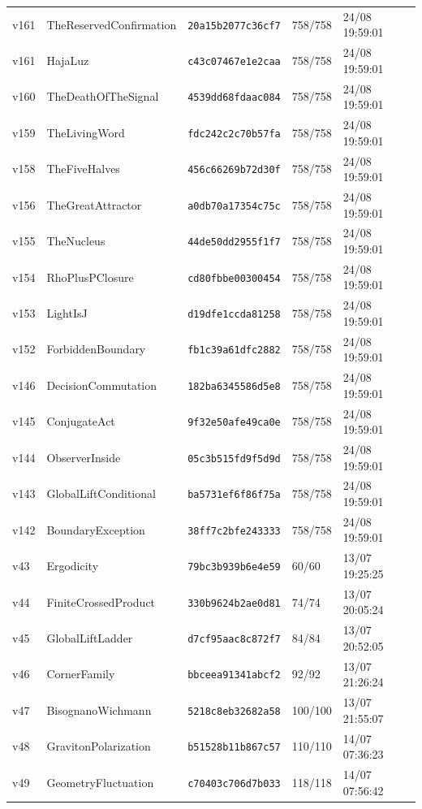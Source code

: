 \documentclass[11pt]{article}
\theoremstyle{definition}\newtheorem{deriv}{Derivation}
\begin{document}
{\begin{longtable}{@{}lllll@{}}
v161 & TheReservedConfirmation & \texttt{20a15b2077c36cf7} & 758/758 & 24/08 19:59:01 \\
v161 & HajaLuz & \texttt{c43c07467e1e2caa} & 758/758 & 24/08 19:59:01 \\
v160 & TheDeathOfTheSignal & \texttt{4539dd68fdaac084} & 758/758 & 24/08 19:59:01 \\
v159 & TheLivingWord & \texttt{fdc242c2c70b57fa} & 758/758 & 24/08 19:59:01 \\
v158 & TheFiveHalves & \texttt{456c66269b72d30f} & 758/758 & 24/08 19:59:01 \\
v156 & TheGreatAttractor & \texttt{a0db70a17354c75c} & 758/758 & 24/08 19:59:01 \\
v155 & TheNucleus & \texttt{44de50dd2955f1f7} & 758/758 & 24/08 19:59:01 \\
v154 & RhoPlusPClosure & \texttt{cd80fbbe00300454} & 758/758 & 24/08 19:59:01 \\
v153 & LightIsJ & \texttt{d19dfe1ccda81258} & 758/758 & 24/08 19:59:01 \\
v152 & ForbiddenBoundary & \texttt{fb1c39a61dfc2882} & 758/758 & 24/08 19:59:01 \\
v146 & DecisionCommutation & \texttt{182ba6345586d5e8} & 758/758 & 24/08 19:59:01 \\
v145 & ConjugateAct & \texttt{9f32e50afe49ca0e} & 758/758 & 24/08 19:59:01 \\
v144 & ObserverInside & \texttt{05c3b515fd9f5d9d} & 758/758 & 24/08 19:59:01 \\
v143 & GlobalLiftConditional & \texttt{ba5731ef6f86f75a} & 758/758 & 24/08 19:59:01 \\
v142 & BoundaryException & \texttt{38ff7c2bfe243333} & 758/758 & 24/08 19:59:01 \\
v43 & Ergodicity & \texttt{79bc3b939b6e4e59} & 60/60 & 13/07 19:25:25 \\
v44 & FiniteCrossedProduct & \texttt{330b9624b2ae0d81} & 74/74 & 13/07 20:05:24 \\
v45 & GlobalLiftLadder & \texttt{d7cf95aac8c872f7} & 84/84 & 13/07 20:52:05 \\
v46 & CornerFamily & \texttt{bbceea91341abcf2} & 92/92 & 13/07 21:26:24 \\
v47 & BisognanoWichmann & \texttt{5218c8eb32682a58} & 100/100 & 13/07 21:55:07 \\
v48 & GravitonPolarization & \texttt{b51528b11b867c57} & 110/110 & 14/07 07:36:23 \\
v49 & GeometryFluctuation & \texttt{c70403c706d7b033} & 118/118 & 14/07 07:56:42 \\

\end{longtable}}
\end{document}
